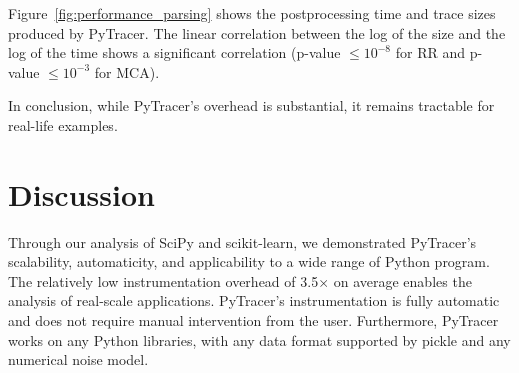 \documentclass[11pt]{article}
\newcommand{\tristan}[1]{\color{orange}\textbf{From Tristan:} #1\color{black}\xspace}
\newcommand{\pytracer}[0]{PyTracer\xspace}
\begin{document}

Figure~\ref{fig:performance_parsing} shows
the postprocessing time and trace sizes produced by \pytracer. 
The linear correlation between the log of the size and the log of the time shows a significant correlation 
(p-value $\leq 10^{-8}$ for RR and p-value $\leq 10^{-3}$ for MCA).

In conclusion, while \pytracer's overhead is substantial, it remains tractable for real-life examples.

\section{Discussion}



Through our analysis of SciPy and scikit-learn, we demonstrated \pytracer's scalability, automaticity, and applicability to a wide range of Python program. The relatively low instrumentation overhead of 3.5$\times$ on average enables the analysis of real-scale applications. \pytracer's instrumentation is fully automatic and does not require manual intervention from the user. Furthermore, \pytracer works on any Python libraries, with any data format supported by pickle and any numerical noise model.
\end{document}
